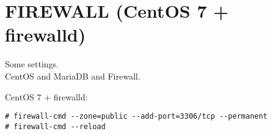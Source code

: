 \section{FIREWALL (CentOS 7 + firewalld)}
\par
Some settings. \\
CentOS and MariaDB and Firewall.

\par
CentOS 7 + firewalld:
\begin{Verbatim}[frame=single]
# firewall-cmd --zone=public --add-port=3306/tcp --permanent
# firewall-cmd --reload
\end{Verbatim}
